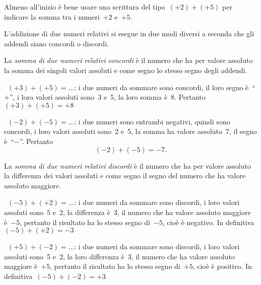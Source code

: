 Almeno all'inizio è bene usare una scrittura del tipo~\((+2)+(+5)\) per 
indicare la somma tra i numeri~\(+2\) e~\(+5\).

L'addizione di due numeri relativi si esegue in due modi diversi a seconda 
che 
gli addendi siano concordi o discordi.

La \emph{somma di due numeri relativi concordi} è il numero che ha per 
valore 
assoluto la somma dei singoli valori assoluti e
come segno lo stesso segno degli addendi.
 \begin{esempio}
~\((+3)+(+5)=\ldots\): i due numeri da sommare sono concordi, 
il loro segno è~``\(+\)'', i loro valori assoluti sono~3 e~5,
la loro somma è~8. Pertanto~\((+3)+(+5)=+8\)
 \end{esempio}

 \begin{esempio}
~\((-2)+(-5)=\ldots\): i due numeri sono entrambi negativi, quindi sono 
concordi, 
i loro valori assoluti sono~2 e~5,
la somma ha valore assoluto~7, il segno è~``\(-\)''. Pertanto
\[(-2)+(-5)=-7.\]
 \end{esempio}


La \emph{somma di due numeri relativi discordi} è il numero che ha per 
valore 
assoluto la differenza dei valori assoluti
e come segno il segno del numero che ha valore assoluto maggiore.

 \begin{esempio}
~\((-5)+(+2)=\ldots\): i due numeri da sommare sono discordi, i loro valori 
assoluti sono~5 e~2, la differenza è~3,
il numero che ha valore assoluto maggiore è~\(-5\), pertanto il risultato 
ha lo 
stesso segno di~\(-5\), cioè è negativo.
In definitiva~\((-5)+(+2)=-3\)
 \end{esempio}

 \begin{esempio}
~\((+5)+(-2)=\ldots\): i due numeri da sommare sono discordi, i loro valori 
assoluti sono~5 e~2, la loro differenza è~3,
il numero che ha valore assoluto maggiore è~\(+5\), pertanto il risultato 
ha lo 
stesso segno di~\(+5\),
cioè è positivo. In definitiva~\((-5)+(-2)=+3\)
 \end{esempio}

